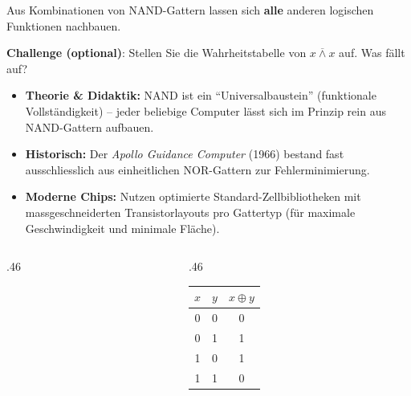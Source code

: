 \begin{frame}
\begin{center}
Aus Kombinationen von NAND-Gattern lassen sich \textbf{alle} anderen logischen Funktionen nachbauen.
\vspace{4mm}

\textbf{Challenge (optional)}: Stellen Sie die Wahrheitstabelle von $\overline{x \wedge x}$ auf. Was fällt auf?
\end{center}
\end{frame}

\begin{frame}
\begin{itemize}[<+->]
    \item \textbf{Theorie \& Didaktik:} NAND ist ein \enquote{Universalbaustein} (funktionale Vollständigkeit) -- jeder beliebige Computer lässt sich im Prinzip rein aus NAND-Gattern aufbauen.
    \item \textbf{Historisch:} Der \textit{Apollo Guidance Computer} (1966) bestand fast ausschliesslich aus einheitlichen NOR-Gattern zur Fehlerminimierung.
    \item \textbf{Moderne Chips:} Nutzen optimierte Standard-Zellbibliotheken mit massgeschneiderten Transistorlayouts pro Gattertyp (für maximale Geschwindigkeit und minimale Fläche).
\end{itemize}
\end{frame}

\begin{frame}
\begin{columns}[c,onlytextwidth]
\begin{column}{.46\textwidth}

\end{column}
\begin{column}{.46\textwidth}
\begin{tabular}{ccc}
    $x$ & $y$ & $x \oplus y$ \\\midrule
    0 & 0 & 0 \\
    0 & 1 & 1 \\
    1 & 0 & 1 \\
    1 & 1 & 0 \\
\end{tabular}
\end{column}
\end{columns}
\end{frame}

